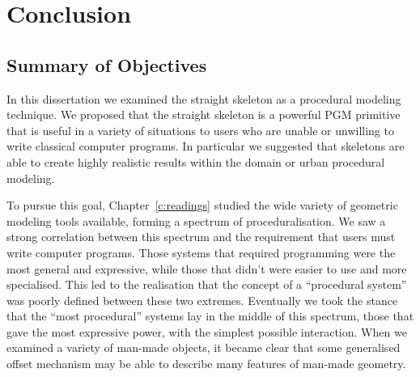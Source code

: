 \chapter{Conclusion}
\label{c:conclusion}

\begin{comment}
We propose that a geometric construct, the \emph{straight skeleton}, and its generalisations, are a powerful technique for the creation of PGM systems that are accessible to people without programming skills.  Systems exploiting these skeletons and variations thereof are able to generate large scale, varied and highly realistic results within the domain of urban procedural modeling.
\end{comment}






\section{Summary of Objectives}

In this dissertation we examined the straight skeleton as a procedural modeling technique. We proposed that the straight skeleton is a powerful PGM primitive that is useful in a variety of situations to users who are unable or unwilling to write classical computer programs. In particular we suggested that skeletons are able to create highly realistic results within the domain or urban procedural modeling.

To pursue this goal, Chapter~\ref{c:readings} studied the wide variety of geometric modeling tools available, forming a spectrum of proceduralisation. We saw a strong correlation between this spectrum and the requirement that users must write computer programs. Those systems that required programming were the most general and expressive, while those that didn't were easier to use and more specialised. This led to the realisation that the concept of a ``procedural system'' was poorly defined between these two extremes. Eventually we took the stance that the ``most procedural'' systems lay in the middle of this spectrum, those that gave the most expressive power, with the simplest possible interaction. When we examined a variety of man-made objects, it became clear that some generalised offset mechanism may be able to describe many features of man-made geometry.

